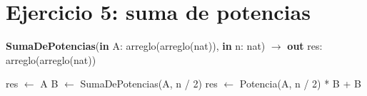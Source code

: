 \section{Ejercicio 5: suma de potencias}

\begin{algorithm}[H]
\caption{
    \textbf{SumaDePotencias}(\textbf{in} A: arreglo(arreglo(nat)), \textbf{in} n: nat) $\to$ \textbf{out} res: arreglo(arreglo(nat))
}
\begin{algorithmic}[1]
        \State res $\gets$ A
    \Else
        \State B $\gets$ SumaDePotencias(A, n / 2)
        \State res $\gets$ Potencia(A, n / 2) * B + B
    \EndIf
\end{algorithmic}
\end{algorithm}
